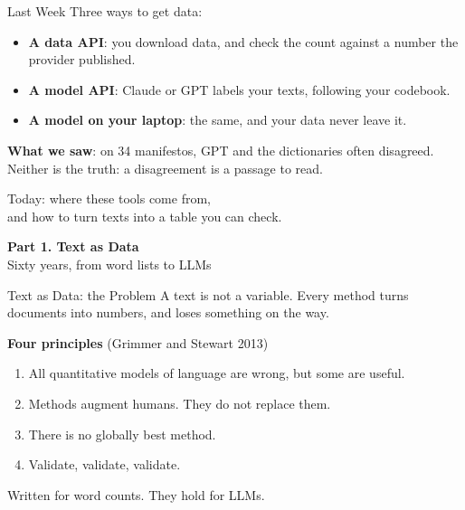 \documentclass[svgnames,x11names,dvipsnames]{beamer}
\newcommand{\chg}[1]{{\bfseries #1}}
\renewcommand{\chg}[1]{#1}
\newcommand{\new}[1]{#1}
\newcommand{\sectionslide}[2]{%
\begin{frame}[plain]
  \centering
  \vfill
  {\LARGE \textbf{\textcolor{titleblue}{#1}}}\\[0.4cm]
  {#2}
  \vfill
\end{frame}}
\begin{document}
\begin{frame}{\new{Last Week}}
\small
Three ways to get data:

\vspace{0.2cm}
\begin{itemize}
    \setlength{\itemsep}{6pt}
    \item \textbf{A data API}: you download data, and check the count against a number the provider published.
    \item \textbf{A model API}: Claude or GPT labels your texts, following your codebook.
    \item \textbf{A model on your laptop}: the same, and your data never leave it.
\end{itemize}

\vspace{0.5cm}
\textbf{What we saw}: on 34 manifestos, GPT and the dictionaries often disagreed. Neither is the truth: a disagreement is a passage to read.

\vspace{0.6cm}
\centering
\alert{Today: where these tools come from,\\ and how to turn texts into a table you can check.}
\end{frame}

\sectionslide{Part 1. Text as Data}{Sixty years, from word lists to LLMs}

\begin{frame}{\chg{Text as Data: the Problem}}
\small
A text is not a variable. Every method turns documents into numbers, and loses something on the way.

\vspace{0.4cm}
\textbf{Four principles} (Grimmer and Stewart 2013)
\begin{enumerate}
    \setlength{\itemsep}{4pt}
    \item All quantitative models of language are wrong, but some are useful.
    \item Methods augment humans. They do not replace them.
    \item There is no globally best method.
    \item Validate, validate, validate.
\end{enumerate}

\vspace{0.5cm}
\centering
\alert{Written for word counts. They hold for LLMs.}
\end{frame}
\end{document}
